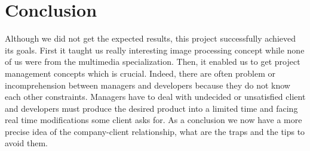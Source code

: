 
\section{Conclusion}
Although we did not get the expected results, this project successfully achieved its goals. First it taught us really interesting image processing concept while none of us were from the multimedia specialization. Then, it enabled us to get project management concepts which is crucial. Indeed, there are often problem or incomprehension between managers and developers because they do not know each other constraints. Managers have to deal with undecided or unsatisfied client and developers must produce the desired product into a limited time and facing real time modifications some client asks for. As a conclusion we now have a more precise idea of the company-client relationship, what are the traps and the tips to avoid them.



